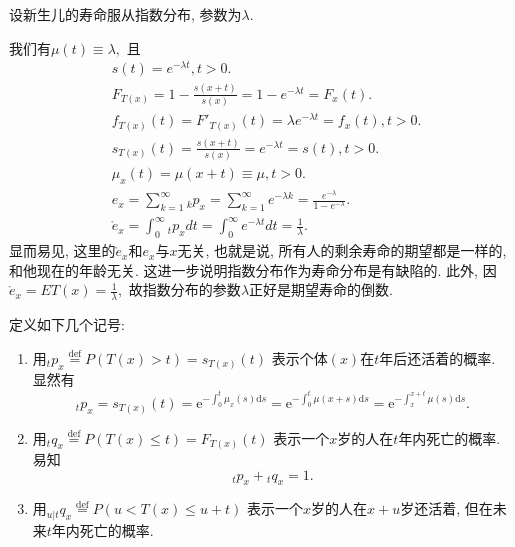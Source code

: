 \documentclass[lang=cn,10pt]{elegantbook}
\begin{document}
\begin{example}
    设新生儿的寿命服从指数分布, 参数为$\lambda$.
\end{example}
\begin{solution}
	我们有$\mu(t)\equiv\lambda,$ 且
    \begin{align*}
         & s(t)=e^{-\lambda t},t>0.                                                                                       \\
         & F_{T(x)}=1-\frac{s(x+t)}{s(x)}=1-e^{- \lambda t}=F_x(t).   \\
         & f_{T(x)}(t)={F'}_{T(x)}(t)=\lambda e^{- \lambda t}=f_x(t),t>0.  \\
         & s_{T(x)}(t)=\frac{s(x+t)}{s(x)}=e^{-\lambda t}=s(t),t>0. \\
         & \mu_x(t)=\mu(x+t)\equiv\mu,t>0. \\
         & e_x = \sum_{k=1}^{\infty} {_kp_x}=\sum_{k=1}^{\infty} {e^{- \lambda k}}=\frac{e^{- \lambda}}{1-e^{- \lambda}}. \\
         & \mathring{e}_x=\int_{0}^{\infty}{_tp_x}dt=\int_{0}^{\infty}{e^{- \lambda t}}dt=\frac{1}{\lambda}.
    \end{align*}
    显而易见, 这里的$\mathring e_x $和$e_x$与$x$无关, 也就是说,  所有人的剩余寿命的期望都是一样的, 和他现在的年龄无关. 这进一步说明指数分布作为寿命分布是有缺陷的.   此外, 因$\mathring{e}_x=ET(x)=\frac{1}{\lambda},$ 故指数分布的参数$\lambda$正好是期望寿命的倒数.
\end{solution}

\begin{proposition}
	定义如下几个记号:
\begin{enumerate}
    \item 用$_tp_{x}\stackrel{\text{def}}{=}P(T(x)>t)=s_{T(x)}(t)$
        表示个体$(x)$在$t$年后还活着的概率. 显然有
        $$ {}_tp_x=s_{T(x)}(t)=\mathrm{e}^{-\int_{0}^{t}\mu_x(s)\mathrm{d}s}=\mathrm{e}^{-\int_{0}^{t}\mu(x+s)\mathrm{d}s}=\mathrm{e}^{-\int_{x}^{x+t}\mu(s)\mathrm{d}s}.$$
    \item 用$_tq_{x}\stackrel{\text{def}}{=}P(T(x)\leq t)=F_{T(x)}(t)$
        表示一个$x$岁的人在$t$年内死亡的概率. 易知
        $$_tp_{x}+{}_tq_{x}=1.$$
    \item 用$ _{u|t}q_x\stackrel{\text{def}}{=}P(u<T(x)\leq u+t)$
        表示一个$x$岁的人在$x+u$岁还活着, 但在未来$t$年内死亡的概率.
\end{enumerate}
\end{proposition}
\end{document}
